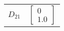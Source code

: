 \begin{tabular}{cl}
 $D_{21}$ & $\left[\begin{matrix}0\\1.0\end{matrix}\right]$                                                                                                                                                                                                                                                                                                                                                                                                                                                                                                                                                                                                                                                                                                                                                                                                                                                                                                                                                                                                                                                                                                                                                                                                                                                                                                                                                                                                                                                                                                                                                                                                                                                                                                                                                                                                                                                                                                                                                                                                                                                                                                                                                                                                                                                                                                                                                                                                                                                                                                                                                                                                                                                                                                                                                                                                                                                                                                                                                                                                                                                                                                                                                                                                                                                         
\end{tabular}
